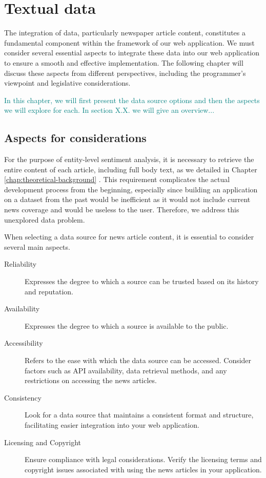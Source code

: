 \chapter{Textual data}
\label{chap:textual-data}

The integration of data, particularly newspaper article content, constitutes a fundamental component within the framework of our web application. We must consider several essential aspects to integrate these data into our web application to ensure a smooth and effective implementation. The following chapter will discuss these aspects from different perspectives, including the programmer's viewpoint and legislative considerations. 

\textcolor{teal}{In this chapter, we will first present the data source options and then the aspects we will explore for each. In section X.X. we will give an overview...}

\section{Aspects for considerations}
For the purpose of entity-level sentiment analysis, it is necessary to retrieve the entire content of each article, including full body text, as we detailed in Chapter \ref{chap:theoretical-background} . This requirement complicates the actual development process from the beginning, especially since building an application on a dataset from the past would be inefficient as it would not include current news coverage and would be useless to the user. Therefore, we address this unexplored data problem.

When selecting a data source for news article content, it is essential to consider several main aspects.

\begin{description}
    \item[Reliability] Expresses the degree to which a source can be trusted based on its history and reputation.
    \item[Availability] Expresses the degree to which a source is available to the public.
    \item[Accessibility] Refers to the ease with which the data source can be accessed. Consider factors such as API availability, data retrieval methods, and any restrictions on accessing the news articles.
    \item[Consistency] Look for a data source that maintains a consistent format and structure, facilitating easier integration into your web application. 
    \item[Licensing and Copyright] Ensure compliance with legal considerations. Verify the licensing terms and copyright issues associated with using the news articles in your application.
\end{description}

